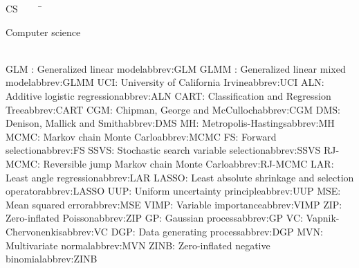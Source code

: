  
 
 
 
 
\begin{tabbing}
CS~~~~~\=\parbox{6in}{\hspace{.4in}Computer science\dotfill \pageref{abbrev:CS}}\\
\addabbrev GLM : {\hspace{.4in}Generalized linear model}{abbrev:GLM}
\addabbrev GLMM : {\hspace{.4in}Generalized linear mixed model}{abbrev:GLMM}
\addabbrev UCI: {\hspace{.4in}University of California Irvine}{abbrev:UCI}
\addabbrev ALN: {\hspace{.4in}Additive logistic regression}{abbrev:ALN}
\addabbrev CART: {\hspace{.4in}Classification and Regression Tree}{abbrev:CART}
\addabbrev CGM: {\hspace{.4in}Chipman, George and McCulloch}{abbrev:CGM}
\addabbrev DMS: {\hspace{.4in}Denison, Mallick and Smith}{abbrev:DMS}
\addabbrev MH: {\hspace{.4in}Metropolis-Hastings}{abbrev:MH}
\addabbrev MCMC: {\hspace{.4in}Markov chain Monte Carlo}{abbrev:MCMC}
\addabbrev FS: {\hspace{.4in}Forward selection}{abbrev:FS}
\addabbrev SSVS: {\hspace{.4in}Stochastic search variable selection}{abbrev:SSVS}
\addabbrev RJ-MCMC: {\hspace{.4in}Reversible jump Markov chain Monte Carlo}{abbrev:RJ-MCMC}
\addabbrev LAR: {\hspace{.4in}Least angle regression}{abbrev:LAR}
\addabbrev LASSO: {\hspace{.4in}Least absolute shrinkage and selection operator}{abbrev:LASSO}
\addabbrev UUP: {\hspace{.4in}Uniform uncertainty principle}{abbrev:UUP}
\addabbrev MSE: {\hspace{.4in}Mean squared error}{abbrev:MSE}
\addabbrev VIMP: {\hspace{.4in}Variable importance}{abbrev:VIMP}
\addabbrev ZIP: {\hspace{.4in}Zero-inflated Poisson}{abbrev:ZIP}
\addabbrev GP: {\hspace{.4in}Gaussian process}{abbrev:GP}
\addabbrev VC: {\hspace{.4in}Vapnik-Chervonenkis}{abbrev:VC}
\addabbrev DGP: {\hspace{.4in}Data generating process}{abbrev:DGP}
\addabbrev MVN: {\hspace{.4in}Multivariate normal}{abbrev:MVN}
\addabbrev ZINB: {\hspace{.4in}Zero-inflated negative binomial}{abbrev:ZINB}

\end{tabbing}